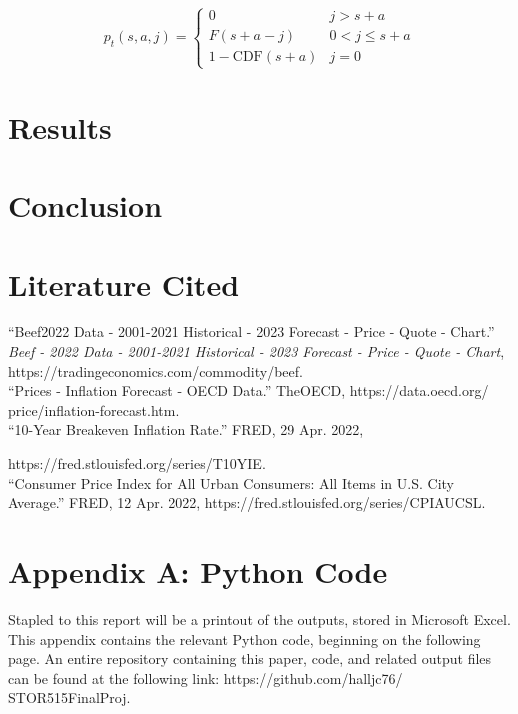 \documentclass[12pt,a4paper]{article}
\begin{document}
\normalsize

\begin{equation} \label{4}
p_{t}(s,a,j) = \begin{cases} 0 & j > s + a \\ F(s + a - j) & 0 < j \leq s + a \\ 1 - \text{CDF}(s + a) & j = 0 \end{cases}
\end{equation}

\section{Results}

\section{Conclusion}

\newpage

\section{Literature Cited}

“Beef2022 Data - 2001-2021 Historical - 2023 Forecast - Price - Quote - Chart.” 
\textit{Beef - 2022 Data - 2001-2021 Historical - 2023 Forecast - Price - Quote - Chart}, https://tradingeconomics.com/commodity/beef. 
\\

“Prices - Inflation Forecast - OECD Data.” TheOECD,
https://data.oecd.org/
price/inflation-forecast.htm. 
\\

“10-Year Breakeven Inflation Rate.” FRED, 29 Apr. 2022, 

https://fred.stlouisfed.org/series/T10YIE. 
\\

“Consumer Price Index for All Urban Consumers: All Items in U.S. City Average.” FRED, 12 Apr. 2022, https://fred.stlouisfed.org/series/CPIAUCSL. 

\section{Appendix A: Python Code}

Stapled to this report will be a printout of the outputs, stored in Microsoft Excel. This appendix contains the relevant Python code, beginning on the following page. An entire repository containing this paper, code, and related output files can be found at the following link: 
https://github.com/halljc76/
STOR515FinalProj. 
\\
\end{document}
